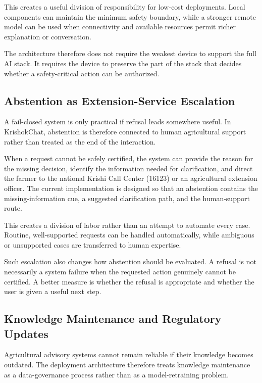 \documentclass[a4paper,fleqn]{cas-dc}
\begin{document}
This creates a useful division of responsibility for low-cost deployments. Local components can maintain the minimum safety boundary, while a stronger remote model can be used when connectivity and available resources permit richer explanation or conversation.

The architecture therefore does not require the weakest device to support the full AI stack. It requires the device to preserve the part of the stack that decides whether a safety-critical action can be authorized.

\subsection{Abstention as Extension-Service Escalation}

A fail-closed system is only practical if refusal leads somewhere useful. In KrishokChat, abstention is therefore connected to human agricultural support rather than treated as the end of the interaction.

When a request cannot be safely certified, the system can provide the reason for the missing decision, identify the information needed for clarification, and direct the farmer to the national Krishi Call Center (16123) or an agricultural extension officer. The current implementation is designed so that an abstention contains the missing-information cue, a suggested clarification path, and the human-support route. 

This creates a division of labor rather than an attempt to automate every case. Routine, well-supported requests can be handled automatically, while ambiguous or unsupported cases are transferred to human expertise.

Such escalation also changes how abstention should be evaluated. A refusal is not necessarily a system failure when the requested action genuinely cannot be certified. A better measure is whether the refusal is appropriate and whether the user is given a useful next step.

\subsection{Knowledge Maintenance and Regulatory Updates}

Agricultural advisory systems cannot remain reliable if their knowledge becomes outdated. The deployment architecture therefore treats knowledge maintenance as a data-governance process rather than as a model-retraining problem.
\end{document}
